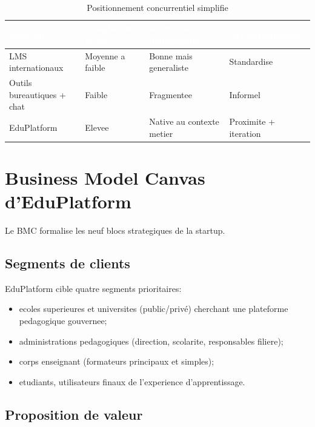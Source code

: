 ﻿﻿\documentclass[12pt,a4paper,oneside]{report}
\begin{document}
\renewcommand{\arraystretch}{1.3}
\begin{table}[H]
\centering
\caption{Positionnement concurrentiel simplifie}
\label{tab:positionnement_concurrentiel}
\begin{tabular}{|p{3.0cm}|p{3.2cm}|p{3.2cm}|p{3.2cm}|}
\hline
\rowcolor{ustoblue}
\textcolor{white}{Solution} & \textcolor{white}{Adaptation locale} & \textcolor{white}{Gouvernance pedagogique} & \textcolor{white}{Accompagnement} \\
\hline
LMS internationaux & Moyenne a faible & Bonne mais generaliste & Standardise \\
\hline
Outils bureautiques + chat & Faible & Fragmentee & Informel \\
\hline
EduPlatform & Elevee & Native au contexte metier & Proximite + iteration \\
\hline
\end{tabular}
\end{table}

\section{Business Model Canvas d'EduPlatform}

Le BMC formalise les neuf blocs strategiques de la startup\cite{osterwalder2010bmc}.

\subsection{Segments de clients}

EduPlatform cible quatre segments prioritaires:
\begin{itemize}
  \item ecoles superieures et universites (public/privé) cherchant une plateforme pedagogique gouvernee;
  \item administrations pedagogiques (direction, scolarite, responsables filiere);
  \item corps enseignant (formateurs principaux et simples);
  \item etudiants, utilisateurs finaux de l'experience d'apprentissage.
\end{itemize}

\subsection{Proposition de valeur}
\end{document}
